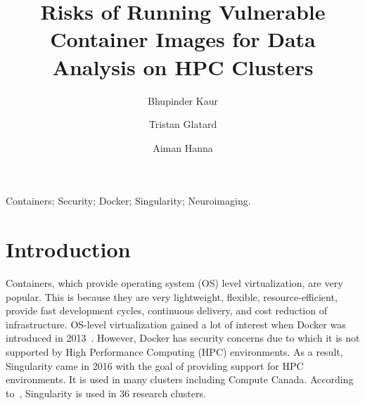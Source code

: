 \documentclass[a4paper,num-refs]{oup-contemporary}
\title{Risks of Running Vulnerable Container Images for Data Analysis on HPC
Clusters}
\begin{document}
\author[1]{Bhupinder Kaur}
\author[1]{Tristan Glatard}
\author[1]{Aiman Hanna}


\maketitle

\begin{keywords}
Containers; Security; Docker; Singularity; Neuroimaging.
\end{keywords}


\section{Introduction}

Containers, which provide operating system (OS) level virtualization, are very
popular. This is because they are very lightweight, flexible, resource-efficient,
provide fast development cycles, continuous delivery,
and cost reduction of infrastructure. OS-level virtualization gained a lot of interest when Docker was
introduced in 2013~\cite{gantikow2016providing}. However, Docker has security concerns due to which it
is not supported by High Performance
Computing (HPC) environments. As a result, Singularity came in 2016 with the goal of providing support
for HPC environments. It is used in many clusters including Compute Canada.
According to~\cite{kurtzer2017singularity}, Singularity is used in 36 research clusters.

\end{document}
